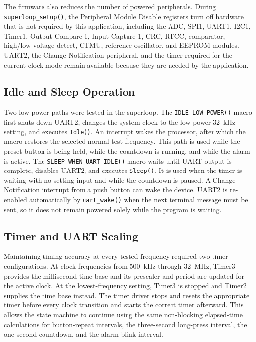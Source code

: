 \documentclass[11pt]{article}
\newcommand{\code}[1]{\texttt{#1}}
\begin{document}
The firmware also reduces the number of powered peripherals. During \code{superloop\_setup()}, the Peripheral Module Disable registers turn off hardware that is not required by this application, including the ADC, SPI1, UART1, I2C1, Timer1, Output Compare 1, Input Capture 1, CRC, RTCC, comparator, high/low-voltage detect, CTMU, reference oscillator, and EEPROM modules. UART2, the Change Notification peripheral, and the timer required for the current clock mode remain available because they are needed by the application.

\subsection{Idle and Sleep Operation}

Two low-power paths were tested in the superloop. The \code{IDLE\_LOW\_POWER()} macro first shuts down UART2, changes the system clock to the low-power 32~kHz setting, and executes \code{Idle()}. An interrupt wakes the processor, after which the macro restores the selected normal test frequency. This path is used while the preset button is being held, while the countdown is running, and while the alarm is active. The \code{SLEEP\_WHEN\_UART\_IDLE()} macro waits until UART output is complete, disables UART2, and executes \code{Sleep()}. It is used when the timer is waiting with no setting input and while the countdown is paused. A Change Notification interrupt from a push button can wake the device. UART2 is re-enabled automatically by \code{uart\_wake()} when the next terminal message must be sent, so it does not remain powered solely while the program is waiting.

\subsection{Timer and UART Scaling}

Maintaining timing accuracy at every tested frequency required two timer configurations. At clock frequencies from 500~kHz through 32~MHz, Timer3 provides the millisecond time base and its prescaler and period are updated for the active clock. At the lowest-frequency setting, Timer3 is stopped and Timer2 supplies the time base instead. The timer driver stops and resets the appropriate timer before every clock transition and starts the correct timer afterward. This allows the state machine to continue using the same non-blocking elapsed-time calculations for button-repeat intervals, the three-second long-press interval, the one-second countdown, and the alarm blink interval.
\end{document}
